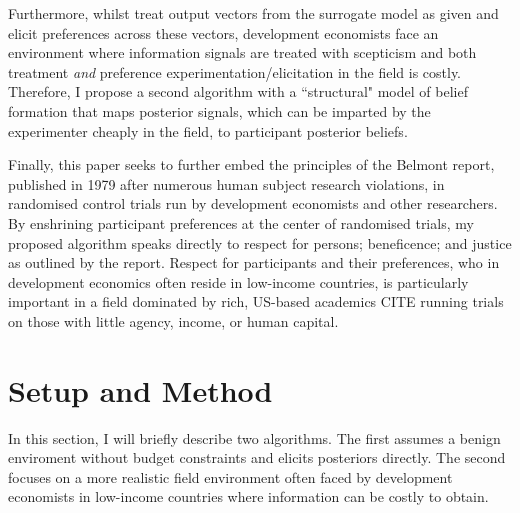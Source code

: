 \documentclass[twoside,11pt]{article}
\begin{document}
Furthermore, whilst \cite{lin2022preference} treat output vectors from the surrogate 
model as given and elicit preferences across these vectors, development economists 
face an environment where information signals are treated with 
scepticism and both treatment \textit{and} preference experimentation/elicitation
 in the field is costly. Therefore, I propose a second algorithm with a ``structural" 
 model of belief formation that maps posterior signals, which can be imparted by 
 the experimenter cheaply in the field, to participant posterior beliefs.


Finally, this paper seeks to further embed the principles of the Belmont report, 
published in 1979 after numerous human subject research violations, in randomised 
control trials run by development economists and other researchers. By enshrining 
participant preferences at the center of randomised trials, my proposed algorithm 
speaks directly to respect for persons; beneficence; and justice as outlined by 
the report. Respect for participants and their preferences, who in development 
economics often reside in low-income countries, is particularly important in 
a field dominated by rich, US-based academics CITE running trials on those with 
little agency, income, or human capital.

\section{Setup and Method}

In this section, I will briefly describe two algorithms. The first assumes a benign 
enviroment without budget constraints and elicits posteriors directly. The second focuses on a more 
realistic field environment often faced by development economists in low-income
countries where information can be costly to obtain.
\end{document}
